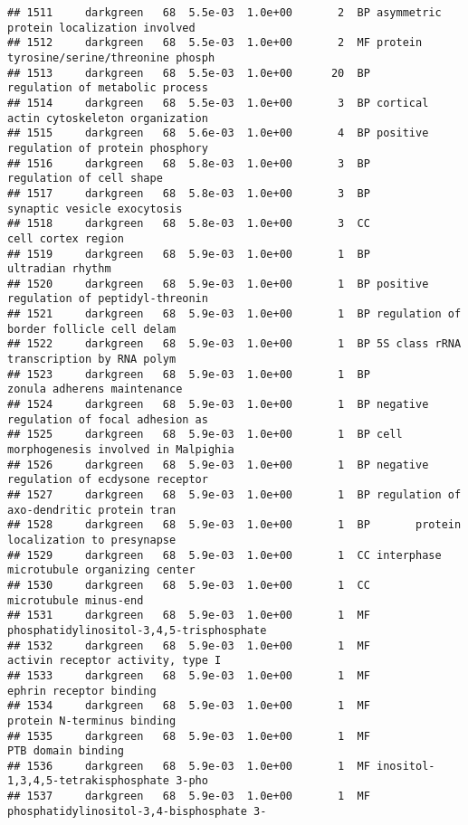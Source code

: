 \documentclass[]{article}
\begin{document}
\begin{verbatim}
## 1511     darkgreen   68  5.5e-03  1.0e+00       2  BP asymmetric protein localization involved
## 1512     darkgreen   68  5.5e-03  1.0e+00       2  MF protein tyrosine/serine/threonine phosph
## 1513     darkgreen   68  5.5e-03  1.0e+00      20  BP          regulation of metabolic process
## 1514     darkgreen   68  5.5e-03  1.0e+00       3  BP cortical actin cytoskeleton organization
## 1515     darkgreen   68  5.6e-03  1.0e+00       4  BP positive regulation of protein phosphory
## 1516     darkgreen   68  5.8e-03  1.0e+00       3  BP                 regulation of cell shape
## 1517     darkgreen   68  5.8e-03  1.0e+00       3  BP              synaptic vesicle exocytosis
## 1518     darkgreen   68  5.8e-03  1.0e+00       3  CC                       cell cortex region
## 1519     darkgreen   68  5.9e-03  1.0e+00       1  BP                         ultradian rhythm
## 1520     darkgreen   68  5.9e-03  1.0e+00       1  BP positive regulation of peptidyl-threonin
## 1521     darkgreen   68  5.9e-03  1.0e+00       1  BP regulation of border follicle cell delam
## 1522     darkgreen   68  5.9e-03  1.0e+00       1  BP 5S class rRNA transcription by RNA polym
## 1523     darkgreen   68  5.9e-03  1.0e+00       1  BP              zonula adherens maintenance
## 1524     darkgreen   68  5.9e-03  1.0e+00       1  BP negative regulation of focal adhesion as
## 1525     darkgreen   68  5.9e-03  1.0e+00       1  BP cell morphogenesis involved in Malpighia
## 1526     darkgreen   68  5.9e-03  1.0e+00       1  BP negative regulation of ecdysone receptor
## 1527     darkgreen   68  5.9e-03  1.0e+00       1  BP regulation of axo-dendritic protein tran
## 1528     darkgreen   68  5.9e-03  1.0e+00       1  BP       protein localization to presynapse
## 1529     darkgreen   68  5.9e-03  1.0e+00       1  CC interphase microtubule organizing center
## 1530     darkgreen   68  5.9e-03  1.0e+00       1  CC                    microtubule minus-end
## 1531     darkgreen   68  5.9e-03  1.0e+00       1  MF phosphatidylinositol-3,4,5-trisphosphate
## 1532     darkgreen   68  5.9e-03  1.0e+00       1  MF        activin receptor activity, type I
## 1533     darkgreen   68  5.9e-03  1.0e+00       1  MF                  ephrin receptor binding
## 1534     darkgreen   68  5.9e-03  1.0e+00       1  MF               protein N-terminus binding
## 1535     darkgreen   68  5.9e-03  1.0e+00       1  MF                       PTB domain binding
## 1536     darkgreen   68  5.9e-03  1.0e+00       1  MF inositol-1,3,4,5-tetrakisphosphate 3-pho
## 1537     darkgreen   68  5.9e-03  1.0e+00       1  MF phosphatidylinositol-3,4-bisphosphate 3-

\end{verbatim}
\end{document}
